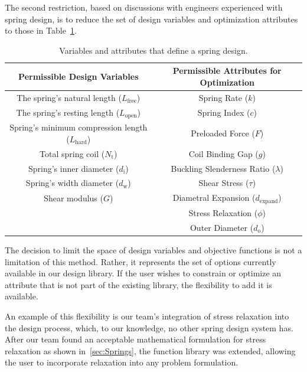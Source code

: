 \documentclass[10pt]{article}
\begin{document}
The second restriction, based on discussions with engineers experienced with spring design, is to reduce the set of design variables and optimization attributes to those in Table~\ref{tab:Design}.
\begin{table}
\caption{Variables and attributes that define a spring design.}
	\centering
	 \begin{tabular}{ c  c }
	 \hline\hline
	 Permissible Design Variables & Permissible Attributes for Optimization \\
	 \hline
     	The spring's natural length ($L_{\text{free}}$) 					& Spring Rate ($k$) \\
	    The spring's resting length ($L_{\text{open}}$) 				& Spring Index ($c$)  \\
		Spring's minimum compression length  ($L_{\text{hard}}$) 	& Preloaded Force ($F$) \\
		Total spring coil ($N_{\text{t}}$)    						& Coil Binding Gap ($g$) \\
		Spring's inner diameter ($d_{\text{i}}$)    					& Buckling Slenderness Ratio ($\lambda$) \\
		Spring's width diameter ($d_{\text{w}}$)    					& Shear Stress ($\tau$) \\
		Shear modulus  ($G$)        							& Diametral Expansion ($d_{\text{expand}}$) \\
														& Stress Relaxation ($\phi$) \\
														& Outer Diameter ($d_{\text{o}}$) \\
\hline\hline
	 \end{tabular}
	 \label{tab:Design}
\end{table}
The decision to limit the space of design variables and objective functions is not a limitation of this method.  Rather, it represents the set of options currently available in our design library.  If the user wishes to constrain or optimize an attribute that is not part of the existing library, the flexibility to add it is available.

An example of this flexibility is our team's integration of stress relaxation into the design process, which, to our knowledge, no other spring design system has. After our team found an acceptable mathematical formulation for stress relaxation as shown in~\ref{sec:Springs}, the function library was extended, allowing the user to incorporate relaxation into any problem formulation.
\end{document}
